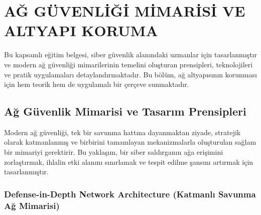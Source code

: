 \chapter{AĞ GÜVENLİĞİ MİMARİSİ VE ALTYAPI KORUMA}

Bu kapsamlı eğitim belgesi, siber güvenlik alanındaki uzmanlar için tasarlanmıştır ve modern ağ güvenliği mimarilerinin temelini oluşturan prensipleri, teknolojileri ve pratik uygulamaları detaylandırmaktadır. Bu bölüm, ağ altyapısının korunması için hem teorik hem de uygulamalı bir çerçeve sunmaktadır.

\section{Ağ Güvenlik Mimarisi ve Tasarım Prensipleri}

Modern ağ güvenliği, tek bir savunma hattına dayanmaktan ziyade, stratejik olarak katmanlanmış ve birbirini tamamlayan mekanizmalarla oluşturulan sağlam bir mimariyi gerektirir. Bu yaklaşım, bir siber saldırganın ağa erişimini zorlaştırmak, ihlalin etki alanını sınırlamak ve tespit edilme şansını artırmak için tasarlanmıştır.

\subsection{Defense-in-Depth Network Architecture (Katmanlı Savunma Ağ Mimarisi)}

